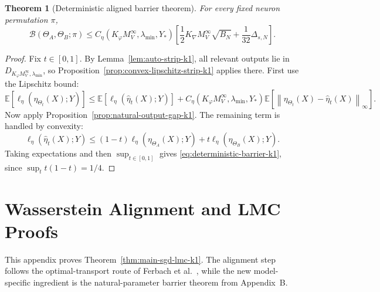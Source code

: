 \documentclass[11pt]{article}
\newtheorem{theorem}{Theorem}
\theoremstyle{definition}
\newcommand{\E}{\mathbb{E}}
\newcommand{\norm}[1]{\left\lVert #1 \right\rVert}
\newcommand{\cB}{\mathcal{B}}
\begin{document}
\begin{theorem}[Deterministic aligned barrier theorem]
\label{thm:deterministic-lmc-k1}
For every fixed neuron permutation $\pi$,
\begin{equation}
  \cB(\Theta_A,\Theta_B;\pi)
  \le
  C_\eta(K_\varphi M_V^\infty,\lambda_{\min},Y_\ast)
  \left[
    \frac12 K_{\nabla}M_V^\infty\sqrt{B_N}
    +
    \frac1{32}\Delta_{s,N}
  \right].
  \label{eq:deterministic-barrier-k1}
\end{equation}
\end{theorem}

\begin{proof}
Fix $t\in[0,1]$. By Lemma~\ref{lem:auto-strip-k1}, all relevant outputs lie in
$D_{K_\varphi M_V^\infty,\lambda_{\min}}$, so
Proposition~\ref{prop:convex-lipschitz-strip-k1} applies there. First use the
Lipschitz bound:
\[
  \E[\ell_\eta(\eta_{\Theta_t}(X);Y)]
  \le
  \E[\ell_\eta(\hat\eta_t(X);Y)]
  +
  C_\eta(K_\varphi M_V^\infty,\lambda_{\min},Y_\ast)
  \E[\norm{\eta_{\Theta_t}(X)-\hat\eta_t(X)}_\infty].
\]
Now apply Proposition~\ref{prop:natural-output-gap-k1}. The remaining term is
handled by convexity:
\[
  \ell_\eta(\hat\eta_t(X);Y)
  \le
  (1-t)\ell_\eta(\eta_{\Theta_A}(X);Y)
  +
  t\ell_\eta(\eta_{\Theta_B}(X);Y).
\]
Taking expectations and then $\sup_{t\in[0,1]}$ gives
\eqref{eq:deterministic-barrier-k1}, since $\sup_t t(1-t)=1/4$.
\end{proof}

\section{Wasserstein Alignment and LMC Proofs}

This appendix proves Theorem~\ref{thm:main-sgd-lmc-k1}. The alignment step
follows the optimal-transport route of Ferbach et al.~\cite{Ferbach2024}, while
the new model-specific ingredient is the natural-parameter barrier theorem from
Appendix~B.
\end{document}
